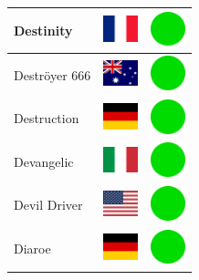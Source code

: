 \documentclass[12pt, a4paper, twoside]{report}
\begin{document}
\begin{center}
\begin{longtable}{|p{5cm}|p{2cm}|p{2cm}|}
Destinity & \includegraphics[width=1cm]{4x3/fr} & \includegraphics[width=1cm]{likes/y} \\ \hline
Deströyer 666 & \includegraphics[width=1cm]{4x3/au} & \includegraphics[width=1cm]{likes/y} \\ \hline
Destruction & \includegraphics[width=1cm]{4x3/de} & \includegraphics[width=1cm]{likes/y} \\ \hline
Devangelic & \includegraphics[width=1cm]{4x3/it} & \includegraphics[width=1cm]{likes/y} \\ \hline
Devil Driver & \includegraphics[width=1cm]{4x3/us} & \includegraphics[width=1cm]{likes/y} \\ \hline
Diaroe & \includegraphics[width=1cm]{4x3/de} & \includegraphics[width=1cm]{likes/y} \\ \hline

\end{longtable}
\end{center}
\end{document}
